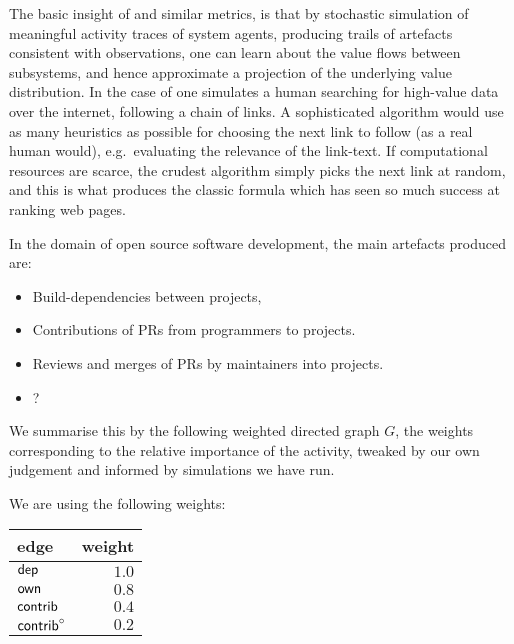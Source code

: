 The basic insight of \pagerank{} and similar metrics, is that by
stochastic simulation of meaningful activity traces of system agents,
producing trails of artefacts consistent with observations, one can
learn about the value flows between subsystems, and hence approximate
a projection of the underlying value distribution. In the case of
\pagerank{} one simulates a human searching for high-value data over
the internet, following a chain of links. A sophisticated algorithm
would use as many heuristics as possible for choosing the next link to
follow (as a real human would), e.g.\ evaluating the relevance of the
link-text. If computational resources are scarce, the crudest
algorithm simply picks the next link at random, and this is what
produces the classic \pagerank{} formula which has seen so much
success at ranking web pages.

In the domain of open source software development, the main artefacts
produced are:
\begin{itemize}
  \item Build-dependencies between projects,
  \item Contributions of PRs from programmers to projects.
  \item Reviews and merges of PRs by maintainers into projects.
  \item ? %
\end{itemize}

We summarise this by the following weighted directed graph $G$, the
weights corresponding to the relative importance of the activity,
tweaked by our own judgement and informed by simulations we have run.


We are using the following weights:
\begin{center}
  \begin{tabular}{lr}
  edge & weight \\
  \hline
  $\mathsf{dep}$ & $1.0$ \\
  $\mathsf{own}$ & $0.8$ \\
  $\mathsf{contrib}$ & $0.4$ \\
  $\mathsf{contrib}^\circ$ & $0.2$
  \end{tabular}
\end{center}

